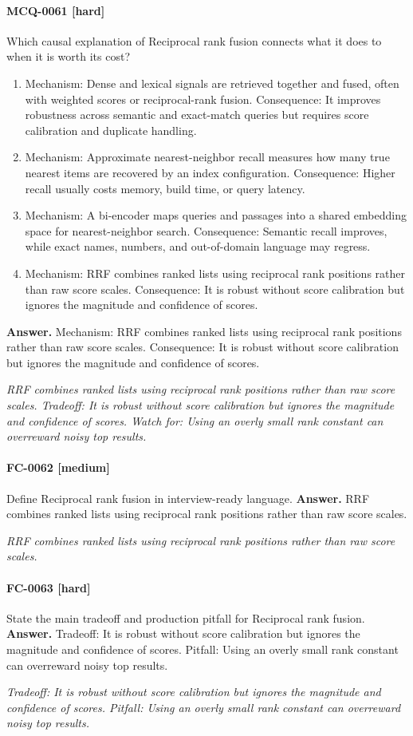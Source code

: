 \paragraph{MCQ-0061 [hard]} Which causal explanation of Reciprocal rank fusion connects what it does to when it is worth its cost?
\begin{enumerate}[label=\Alph*.]
\item Mechanism: Dense and lexical signals are retrieved together and fused, often with weighted scores or reciprocal-rank fusion. Consequence: It improves robustness across semantic and exact-match queries but requires score calibration and duplicate handling.
\item Mechanism: Approximate nearest-neighbor recall measures how many true nearest items are recovered by an index configuration. Consequence: Higher recall usually costs memory, build time, or query latency.
\item Mechanism: A bi-encoder maps queries and passages into a shared embedding space for nearest-neighbor search. Consequence: Semantic recall improves, while exact names, numbers, and out-of-domain language may regress.
\item Mechanism: RRF combines ranked lists using reciprocal rank positions rather than raw score scales. Consequence: It is robust without score calibration but ignores the magnitude and confidence of scores.
\end{enumerate}
\noindent\textbf{Answer.} Mechanism: RRF combines ranked lists using reciprocal rank positions rather than raw score scales. Consequence: It is robust without score calibration but ignores the magnitude and confidence of scores.
\par\textit{RRF combines ranked lists using reciprocal rank positions rather than raw score scales. Tradeoff: It is robust without score calibration but ignores the magnitude and confidence of scores. Watch for: Using an overly small rank constant can overreward noisy top results.}
\paragraph{FC-0062 [medium]} Define Reciprocal rank fusion in interview-ready language.
\noindent\textbf{Answer.} RRF combines ranked lists using reciprocal rank positions rather than raw score scales.
\par\textit{RRF combines ranked lists using reciprocal rank positions rather than raw score scales.}
\paragraph{FC-0063 [hard]} State the main tradeoff and production pitfall for Reciprocal rank fusion.
\noindent\textbf{Answer.} Tradeoff: It is robust without score calibration but ignores the magnitude and confidence of scores. Pitfall: Using an overly small rank constant can overreward noisy top results.
\par\textit{Tradeoff: It is robust without score calibration but ignores the magnitude and confidence of scores. Pitfall: Using an overly small rank constant can overreward noisy top results.}

